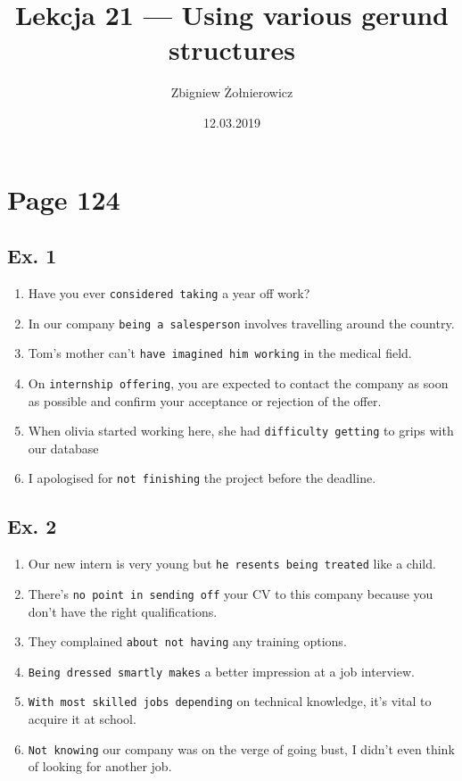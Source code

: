 \documentclass{article}
\begin{document}
\title{Lekcja 21 --- Using various gerund structures}
\author{Zbigniew Żołnierowicz}
\date{12.03.2019}
\maketitle

\section{Page 124}

\subsection{Ex. 1}

\begin{enumerate}
  \item Have you ever {\tt considered taking} a year off work?
  \item In our company {\tt being a salesperson} involves travelling around the country.
  \item Tom's mother can't {\tt have imagined him working} in the medical field.
  \item On {\tt internship offering}, you are expected to contact the company as soon as possible and confirm your acceptance or rejection of the offer.
  \item When olivia started working here, she had {\tt difficulty getting} to grips with our database
  \item I apologised for {\tt not finishing} the project before the deadline.
\end{enumerate}

\subsection{Ex. 2}
\begin{enumerate}
  \item Our new intern is very young but {\tt he resents being treated} like a child.
  \item There's {\tt no point in sending off} your CV to this company because you don't have the right qualifications.
  \item They complained {\tt about not having} any training options.
  \item {\tt Being dressed smartly makes} a better impression at a job interview.
  \item {\tt With most skilled jobs depending} on technical knowledge, it's vital to acquire it at school.
  \item {\tt Not knowing} our company was on the verge of going bust, I didn't even think of looking for another job.
\end{enumerate}
\end{document}
